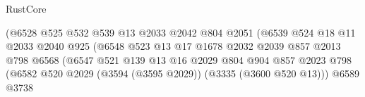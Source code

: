 \begin{lexlean}{RustCore}
\begin{coremodule}
                                              (@6528
                                                @525
                                                @532
                                                @539
                                                @13
                                                @2033
                                                @2042
                                                @804
                                                @2051
                                                (@6539
                                                  @524
                                                  @18
                                                  @11
                                                  @2033
                                                  @2040
                                                  @925
                                                  (@6548
                                                    @523
                                                    @13
                                                    @17
                                                    @1678
                                                    @2032
                                                    @2039
                                                    @857
                                                    @2013
                                                    @798
                                                    @6568
                                                    (@6547
                                                      @521
                                                      @139
                                                      @13
                                                      @16
                                                      @2029
                                                      @804
                                                      @904
                                                      @857
                                                      @2023
                                                      @798
                                                      (@6582
                                                        @520
                                                        @2029
                                                        (@3594 (@3595 @2029))
                                                        (@3335 (@3600 @520 @13)))
                                                      @6589
                                                      @3738

\end{coremodule}
\end{lexlean}
